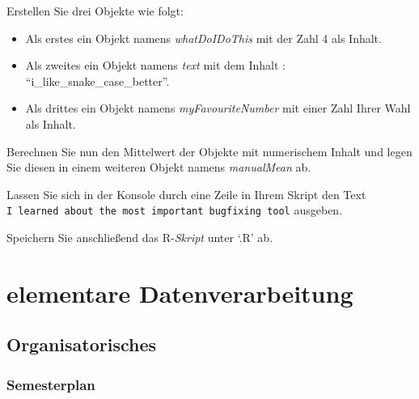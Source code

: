\documentclass[
]{book}
\begin{document}
Erstellen Sie drei Objekte wie folgt:

\begin{itemize}
\item
  Als erstes ein Objekt namens \emph{whatDoIDoThis} mit der Zahl 4 als Inhalt.
\item
  Als zweites ein Objekt namens \emph{text} mit dem Inhalt : ``i\_like\_snake\_case\_better''.
\item
  Als drittes ein Objekt namens \emph{myFavouriteNumber} mit einer Zahl Ihrer Wahl als Inhalt.
\end{itemize}

Berechnen Sie nun den Mittelwert der Objekte mit numerischem Inhalt und legen Sie diesen in einem weiteren Objekt namens \emph{manualMean} ab.

Lassen Sie sich in der Konsole durch eine Zeile in Ihrem Skript den Text \texttt{\textquotesingle{}I\ learned\ about\ the\ most\ important\ bugfixing\ tool\textquotesingle{}} ausgeben.

Speichern Sie anschließend das R-\emph{Skript} unter `.R' ab.

\hypertarget{elementare-datenverarbeitung}{%
\chapter{elementare Datenverarbeitung}\label{elementare-datenverarbeitung}}

\hypertarget{organisatorisches-1}{%
\section{Organisatorisches}\label{organisatorisches-1}}

\hypertarget{semesterplan-2}{%
\subsection{Semesterplan}\label{semesterplan-2}}
\end{document}
